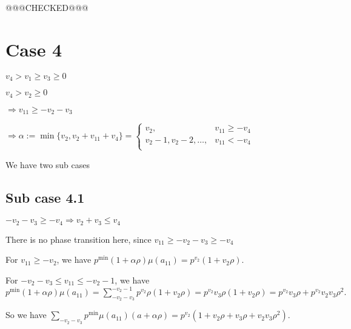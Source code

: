 \documentclass{article}
\begin{document}
@@@CHECKED@@@

\section{Case 4}
$v_4>v_1\geq{v_3}\geq{0}$

$v_4>v_2\geq{0}$

$\Rightarrow{v_{11}}\geq{-v_2-v_3}$

$\Rightarrow\alpha:=\min\{v_2,v_2+v_{11}+v_4\}=\begin{cases}
       v_2, & v_{11}\geq{-v_4}\\
       v_2-1,v_2-2,\dots, & v_{11}<{-v_4}\\
     \end{cases}$

We have two sub cases

\subsection{Sub case 4.1}
$-v_2-v_3\geq{-v_4}\Rightarrow{v_2+v_3\leq{v_4}}$

There is no phase transition here, since $v_{11}\geq{-v_2-v_3}\geq{-v_4}$

For $v_{11}\geq{-v_2}$, we have $p^{\min}(1+\alpha\rho)\mu(a_{11})=p^{v_2}(1+v_2\rho).$

For $-v_2-v_3\leq{v_{11}}\leq{-v_2-1}$, we have $p^{\min}(1+\alpha\rho)\mu(a_{11})=\sum_{-v_2-v_3}^{-v_2-1}p^{v_2}\rho(1+v_2\rho)=p^{v_2}v_3\rho(1+v_2\rho)=p^{v_2}v_3\rho+p^{v_2}v_2v_3\rho^2.$

So we have $\sum_{-v_2-v_3}p^{\min}\mu(a_{11})(a+\alpha\rho)=p^{v_2}(1+v_2\rho+v_3\rho+v_2v_3\rho^2).$
\end{document}
